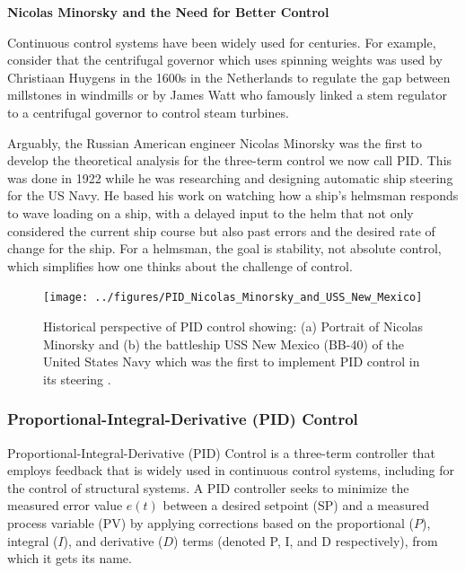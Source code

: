 \documentclass[12pt,letter]{article}
\begin{document}
\begin{review}
	\label{sec:control_systems_review}

		\textbf{Nicolas Minorsky and the Need for Better Control}
	
		\noindent Continuous control systems have been widely used for centuries. For example, consider that the centrifugal governor which uses spinning weights was used by Christiaan Huygens in the 1600s in the Netherlands to regulate the gap between millstones in windmills or by James Watt who famously linked a stem regulator to a centrifugal governor to control steam turbines. 

		Arguably, the Russian American engineer Nicolas Minorsky was the first to develop the theoretical analysis for the three-term control we now call PID. This was done in 1922 while he was researching and designing automatic ship steering for the US Navy. He based his work on watching how a ship's helmsman responds to wave loading on a ship, with a delayed input to the helm that not only considered the current ship course but also past errors and the desired rate of change for the ship. For a helmsman, the goal is stability, not absolute control, which simplifies how one thinks about the challenge of control.
		
	\begin{figure}[H]
		\centering
		\texttt{[image: ../figures/PID\_Nicolas\_Minorsky\_and\_USS\_New\_Mexico]}
		\caption{Historical perspective of PID control showing: (a) Portrait of Nicolas Minorsky \protect\footnotemark[1] and (b) the battleship USS New Mexico (BB-40) of the United States Navy which was the first to implement PID control in its steering \protect\footnotemark[2]. }
		\label{fig:PID_Nicolas_Minorsky_and_USS_New_Mexico}
	\end{figure}

	
\end{review}




\subsubsection{Proportional-Integral-Derivative (PID) Control}

Proportional-Integral-Derivative (PID) Control is a three-term controller that employs feedback that is widely used in continuous control systems, including for the control of structural systems. A PID controller seeks to minimize the measured error value $e(t)$ between a desired setpoint (SP) and a measured process variable (PV) by applying corrections based on the proportional ($P$), integral ($I$), and derivative ($D$) terms (denoted P, I, and D respectively), from which it gets its name.
\end{document}
